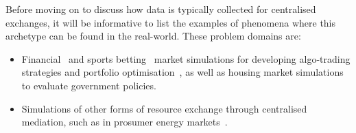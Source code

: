 Before moving on to discuss how data is typically collected for centralised exchanges, it will be informative to list the examples of phenomena where this archetype can be found in the real-world. These problem domains are:
\begin{itemize}
\item{Financial~\cite{fischer2018reinforcement,meng2019reinforcement} and sports betting~\cite{cliff2021bbe} market simulations for developing algo-trading strategies and portfolio optimisation~\cite{dangi2013financial}, as well as housing market simulations~\cite{yilmaz2018stochastic,carro2023heterogeneous} to evaluate government policies.}
\item{Simulations of other forms of resource exchange through centralised mediation, such as in prosumer energy markets~\cite{may2023multi}.} 
\end{itemize}

